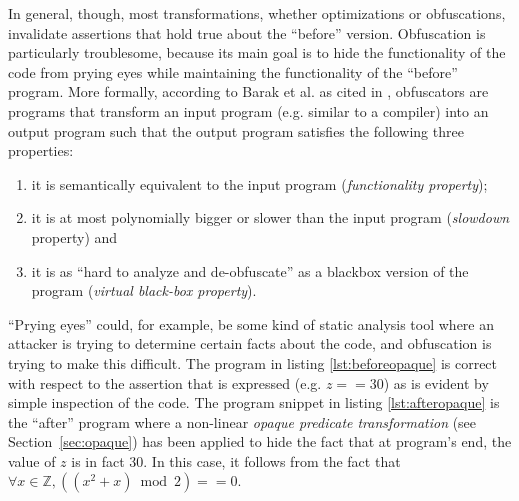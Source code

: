 \documentclass[compsoc,conference,a4paper,10pt,times]{IEEEtran}
\begin{document}
In general, though, most transformations, whether optimizations or obfuscations,
invalidate assertions that hold true about the ``before'' version. Obfuscation is particularly troublesome, because its main goal is to hide the functionality of the code from prying eyes while maintaining the functionality of the ``before'' program. More formally, according to Barak et al. as cited in \cite{BanescuCGNP16}, obfuscators are programs that transform an input program (e.g. similar to a compiler) into an output program such that the output program satisfies the following three properties:
\begin{enumerate}
   \item it is semantically equivalent to the input program (\emph{functionality property}); \label{itm:firstproperty}
   \item it is at most polynomially bigger or slower than the input program (\emph{slowdown} property) and \label{itm:secondproperty}
   \item it is as ``hard to analyze and de-obfuscate'' as a blackbox version of the program (\emph{virtual black-box property}). \label{itm:thirdproperty}
\end{enumerate}
``Prying eyes'' could, for example, be some kind of static analysis tool where an attacker is trying to determine certain facts about the code, and obfuscation is trying to make this difficult. The program in listing \ref{lst:beforeopaque} is correct with respect to the assertion that is expressed (e.g. $z == 30$) as is evident by simple inspection of the code. The program snippet in listing \ref{lst:afteropaque} is the ``after'' program where a non-linear \emph{opaque predicate transformation} (see Section~\ref{sec:opaque}) has been applied to hide the fact that at program's end, the value of $z$ is in fact 30. In this case, it follows from the fact that $\forall x \in \mathbb{Z}, ((x^2 + x)\bmod 2) == 0$. 
\end{document}
